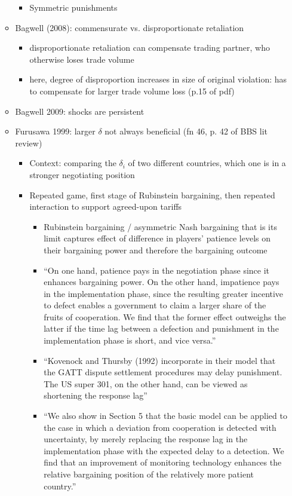 \documentclass[12pt]{article}
\newcommand{\de}{\delta}
\begin{document}
\begin{itemize}
\begin{itemize}
\begin{itemize}
					\item Symmetric punishments
				\end{itemize}
			\item Bagwell (2008): commensurate vs. disproportionate retaliation
				\begin{itemize}
					\item disproportionate retaliation can compensate trading partner, who otherwise loses trade volume
					\item here, degree of disproportion increases in size of original violation: has to compensate for larger trade volume loss (p.15 of pdf)
				\end{itemize}
			\item Bagwell 2009: shocks are persistent
			\item Furusawa 1999: larger $\delta$ not always beneficial (fn 46, p. 42 of BBS lit review)
				\begin{itemize}
					\item Context: comparing the $\de_i$ of two different countries, which one is in a stronger negotiating position
					\item Repeated game, first stage of Rubinstein bargaining, then repeated interaction to support agreed-upon tariffs
						\begin{itemize}
							\item Rubinstein bargaining / asymmetric Nash bargaining that is its limit captures effect of difference in players' patience levels on their bargaining power and therefore the bargaining outcome
							\item ``On one hand, patience pays in the negotiation phase since it enhances bargaining power. On the other hand,
impatience pays in the implementation phase, since the resulting greater incentive to defect enables a government to claim a larger share of the fruits of cooperation. We find that the former effect outweighs the latter if the time lag between a defection and punishment in the implementation phase is short, and vice versa.''
							\item ``Kovenock and Thursby (1992) incorporate in their model that the GATT dispute settlement procedures may delay punishment. The US super 301, on the other hand, can be viewed as shortening the response lag''
							\item ``We also show in Section 5 that the basic model can be applied to the case in which a deviation from cooperation is detected with uncertainty, by merely replacing the response lag in the implementation phase with the expected delay to a detection. We find that an improvement of monitoring technology enhances the relative bargaining position of the relatively more patient country.''

\end{itemize}
\end{itemize}
\end{itemize}
\end{itemize}
\end{document}
